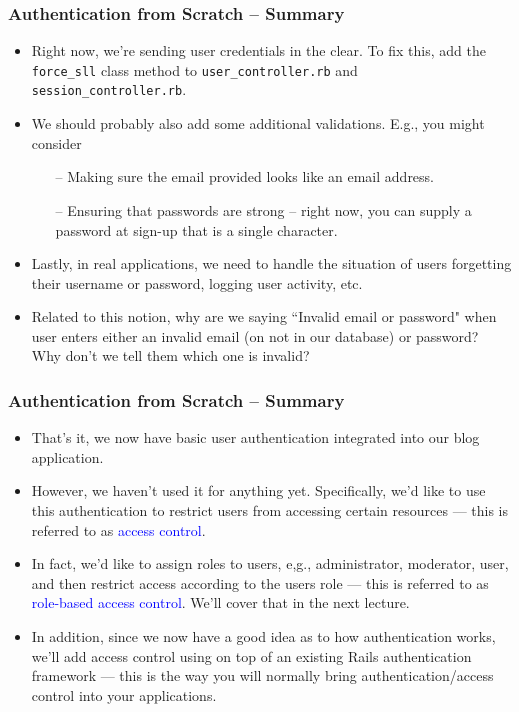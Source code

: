 \documentclass[t,handout]{beamer}
\begin{document}
\begin{frame}\frametitle{Authentication from Scratch -- Summary}
{\small
\begin{itemize}
 \item Right now, we're sending user credentials in the clear.  To fix this, add the {\tt force\_sll} class method to {\tt user\_controller.rb} and {\tt session\_controller.rb}.
 \pause
 \item We should probably also add some additional validations. E.g., you might consider
  \begin{itemize}
   \item[--] Making sure the email provided looks like an email address.
   \pause
   \item[--] Ensuring that passwords are strong -- right now, you can supply a password at sign-up that is a single character.
   \end{itemize}
  \pause
  \item Lastly, in real applications, we need to handle the situation of users forgetting their username or password, logging user activity, etc.
  \pause
  \item Related to this notion, why are we saying ``Invalid email or password" when user enters either an invalid email (on not in our database) or password?~\\
  Why don't we tell them which one is invalid?
 \end{itemize}}
\end{frame}  

\begin{frame}\frametitle{Authentication from Scratch -- Summary}
{\small
\begin{itemize}
\item That's it, we now have basic user authentication integrated into our blog application.
\pause
\item However, we haven't used it for anything yet.  \pause Specifically, we'd like to use this authentication to restrict users from accessing certain resources --- this is referred to as \textcolor{blue}{access control}.
\pause
\item In fact, we'd like to assign roles to users, e,g., administrator, moderator, user, and then restrict access according to the users role --- this is referred to as \textcolor{blue}{role-based access control}.  We'll cover that in the next lecture.
\pause
\item In addition, since we now have a good idea as to how authentication works, we'll add access control using on top of an existing Rails authentication framework --- this is the way you will normally bring authentication/access control into your applications.
\pause
 \end{itemize}}
\end{frame}  
\end{document}
